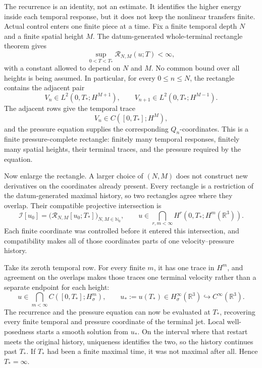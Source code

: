 The recurrence is an identity, not an estimate. It identifies the higher
energy inside each temporal response, but it does not keep the nonlinear
transfers finite. Actual control enters one finite piece at a time. Fix a
finite temporal depth \(N\) and a finite spatial height \(M\). The
datum-generated whole-terminal rectangle theorem gives
\[
\sup_{0<T<T_*}\mathcal R_{N,M}(u;T)<\infty,
\]
with a constant allowed to depend on \(N\) and \(M\). No common bound over all
heights is being assumed. In particular, for every \(0\le n\le N\), the
rectangle contains the adjacent pair
\[
V_n\in L^2(0,T_*;H^{M+1}),
\qquad
V_{n+1}\in L^2(0,T_*;H^{M-1}).
\]
The adjacent rows give the temporal trace
\[
V_n\in C([0,T_*];H^M),
\]
and the pressure equation supplies the corresponding \(Q_n\)-coordinates.
This is a finite pressure-complete rectangle: finitely many temporal responses,
finitely many spatial heights, their terminal traces, and the pressure required
by the equation.

Now enlarge the rectangle. A larger choice of \((N,M)\) does not construct new
derivatives on the coordinates already present. Every rectangle is a
restriction of the datum-generated maximal history, so two rectangles agree
where they overlap. Their compatible projective intersection is
\[
\mathcal I[u_0]
=\bigl(\mathcal R_{N,M}[u_0;T_*]\bigr)_{N,M\in\mathbb N_0},
\qquad
u\in\bigcap_{r,m<\infty}
H^r(0,T_*;H^m(\mathbb R^3)).
\]
Each finite coordinate was controlled before it entered this intersection, and
compatibility makes all of those coordinates parts of one velocity--pressure
history.

Take its zeroth temporal row. For every finite \(m\), it has one trace in
\(H^m\), and agreement on the overlaps makes those traces one terminal
velocity rather than a separate endpoint for each height:
\[
u\in\bigcap_{m<\infty}C([0,T_*];H^m_\sigma),
\qquad
u_*:=u(T_*)
\in H^\infty_\sigma(\mathbb R^3)
\hookrightarrow C^\infty(\mathbb R^3).
\]
The recurrence and the pressure equation can now be evaluated at \(T_*\),
recovering every finite temporal and pressure coordinate of the terminal jet.
Local well-posedness starts a smooth solution from \(u_*\). On the interval
where that restart meets the original history, uniqueness identifies the two,
so the history continues past \(T_*\). If \(T_*\) had been a finite maximal
time, it was not maximal after all. Hence \(T_*=\infty\).

